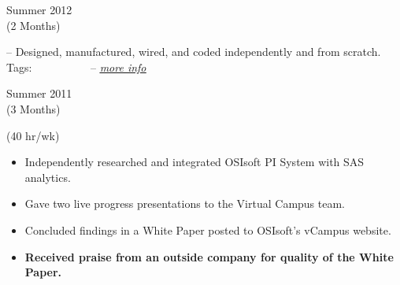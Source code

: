 \divLine

\flushleft \begin{minipage}[t]{\dateColWidth}
Summer 2012 \\
(2 Months)
\end{minipage}
\begin{minipage}[t]{0.8\textwidth}
	--
	Designed, manufactured, wired, and coded independently and from scratch.
	\\[0.2 em]
	Tags: 
	 \vline\ 
	 \vline\ 
	 \vline\ 
	 \vline\ 
	 \vline\ 
	 \vline\ 
	--
	\href{http://www.claytonketner.com/robotic-arm-mk2/}{\uline{\textit{more info}}}
\end{minipage}

\divLine

\flushleft \begin{minipage}[t]{\dateColWidth}
Summer 2011 \\
(3 Months)
\end{minipage}
\begin{minipage}[t]{0.8\textwidth}
 (40 hr/wk) \\[-1 em]
\begin{adjustwidth}{2.5 em}{0 em} 

\begin{itemize} \itemsep-2pt
\setlength{\itemindent}{-2 em}

\item Independently researched and integrated OSIsoft PI System with SAS analytics.
\item Gave two live progress presentations to the Virtual Campus team.
\item Concluded findings in a White Paper posted to OSIsoft's vCampus website.
\item\textbf{Received praise from an outside company for quality of the White Paper.}
\end{itemize}

\end{adjustwidth}
\end{minipage}